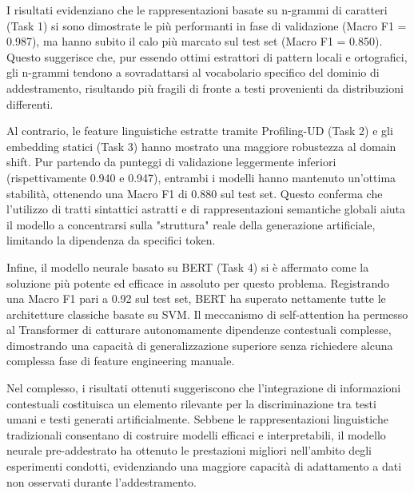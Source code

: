 \documentclass{article}
\begin{document}
I risultati evidenziano che le rappresentazioni basate su n-grammi di caratteri (Task 1) si sono dimostrate le più performanti in fase di validazione (Macro F1 = 0.987), ma hanno subito il calo più marcato sul test set (Macro F1 = 0.850). Questo suggerisce che, pur essendo ottimi estrattori di pattern locali e ortografici, gli n-grammi tendono a sovradattarsi al vocabolario specifico del dominio di addestramento, risultando più fragili di fronte a testi provenienti da distribuzioni differenti.

Al contrario, le feature linguistiche estratte tramite Profiling-UD (Task 2) e gli embedding statici (Task 3) hanno mostrato una maggiore robustezza al domain shift. Pur partendo da punteggi di validazione leggermente inferiori (rispettivamente 0.940 e 0.947), entrambi i modelli hanno mantenuto un'ottima stabilità, ottenendo una Macro F1 di 0.880 sul test set. Questo conferma che l'utilizzo di tratti sintattici astratti e di rappresentazioni semantiche globali aiuta il modello a concentrarsi sulla "struttura" reale della generazione artificiale, limitando la dipendenza da specifici token.

Infine, il modello neurale basato su BERT (Task 4) si è affermato come la soluzione più potente ed efficace in assoluto per questo problema. Registrando una Macro F1 pari a 0.92 sul test set, BERT ha superato nettamente tutte le architetture classiche basate su SVM. Il meccanismo di self-attention ha permesso al Transformer di catturare autonomamente dipendenze contestuali complesse, dimostrando una capacità di generalizzazione superiore senza richiedere alcuna complessa fase di feature engineering manuale.

Nel complesso, i risultati ottenuti suggeriscono che l'integrazione di informazioni contestuali costituisca un elemento rilevante per la discriminazione tra testi umani e testi generati artificialmente. Sebbene le rappresentazioni linguistiche tradizionali consentano di costruire modelli efficaci e interpretabili, il modello neurale pre-addestrato ha ottenuto le prestazioni migliori nell'ambito degli esperimenti condotti, evidenziando una maggiore capacità di adattamento a dati non osservati durante l'addestramento.
\end{document}
